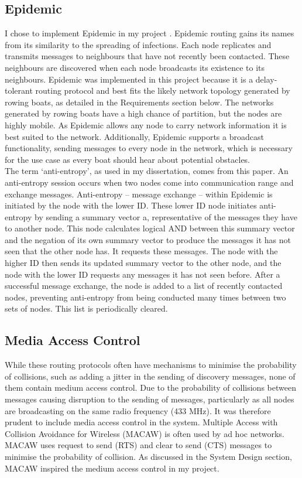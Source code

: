 \documentclass[12pt,a4paper]{report}
\begin{document}
\subsection{Epidemic}
I chose to implement Epidemic in my project \cite{epidemic}. Epidemic routing gains its names from its similarity to the spreading of infections. Each node replicates and transmits messages to neighbours that have not recently been contacted. These neighbours are discovered when each node broadcasts its existence to its neighbours. Epidemic was implemented in this project because it is a delay-tolerant routing protocol and best fits the likely network topology generated by rowing boats, as detailed in the Requirements section below. The networks generated by rowing boats have a high chance of partition, but the nodes are highly mobile. As Epidemic allows any node to carry network information it is best suited to the network. Additionally, Epidemic supports a broadcast functionality, sending messages to every node in the network, which is necessary for the use case as every boat should hear about potential obstacles. \\  %
The term `anti-entropy', as used in my dissertation, comes from this paper. An anti-entropy session occurs when two nodes come into communication range and exchange messages. 
Anti-entropy -- message exchange -- within Epidemic is initiated by the node with the lower ID. These lower ID node initiates anti-entropy by sending a summary vector a, representative of the messages they have to another node. This node calculates logical AND between this summary vector and the negation of its own summary vector to produce the messages it has not seen that the other node has. It requests these messages. The node with the higher ID then sends its updated summary vector to the other node, and the node with the lower ID requests any messages it has not seen before. After a successful message exchange, the node is added to a list of recently contacted nodes, preventing anti-entropy from being conducted many times between two sets of nodes. This list is periodically cleared. 

\subsection{Media Access Control}
While these routing protocols often have mechanisms to minimise the probability of collisions, such as adding a jitter in the sending of discovery messages, none of them contain medium access control. Due to the probability of collisions between messages causing disruption to the sending of messages, particularly as all nodes are broadcasting on the same radio frequency (433 MHz). It was  therefore prudent to include media access control in the system. Multiple Access with Collision Avoidance for Wireless (MACAW) is often used by ad hoc networks. MACAW uses request to send (RTS) and clear to send (CTS) messages to minimise the probability of collision. As discussed in the System Design section, MACAW inspired the medium access control in my project. 
\end{document}
